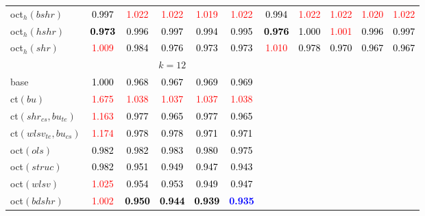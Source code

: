 \begin{tabular}[t]{l|>{}cccc>{}c|ccccc}
oct$_h(bshr)$ & \textcolor{black}{0.997} & \textcolor{red}{1.022} & \textcolor{red}{1.022} & \textcolor{red}{1.019} & \textcolor{red}{1.022} & \textcolor{black}{0.994} & \textcolor{red}{1.022} & \textcolor{red}{1.022} & \textcolor{red}{1.020} & \textcolor{red}{1.022}\\
oct$_h(hshr)$ & \textcolor{black}{\textbf{0.973}} & \textcolor{black}{0.996} & \textcolor{black}{0.997} & \textcolor{black}{0.994} & \textcolor{black}{0.995} & \textcolor{black}{\textbf{0.976}} & \textcolor{black}{1.000} & \textcolor{red}{1.001} & \textcolor{black}{0.996} & \textcolor{black}{0.997}\\
oct$_h(shr)$ & \textcolor{red}{1.009} & \textcolor{black}{0.984} & \textcolor{black}{0.976} & \textcolor{black}{0.973} & \textcolor{black}{0.973} & \textcolor{red}{1.010} & \textcolor{black}{0.978} & \textcolor{black}{0.970} & \textcolor{black}{0.967} & \textcolor{black}{0.967}\\
\addlinespace[0.3em]
\multicolumn{1}{c}{} & \multicolumn{5}{c}{\textbf{$k = 12$}} & \multicolumn{5}{c}{}\\
base & \textcolor{black}{1.000} & \textcolor{black}{0.968} & \textcolor{black}{0.967} & \textcolor{black}{0.969} & \textcolor{black}{0.969} &  &  &  &  & \\
ct$(bu)$ & \textcolor{red}{1.675} & \textcolor{red}{1.038} & \textcolor{red}{1.037} & \textcolor{red}{1.037} & \textcolor{red}{1.038} &  &  &  &  & \\
ct$(shr_{cs}, bu_{te})$ & \textcolor{red}{1.163} & \textcolor{black}{0.977} & \textcolor{black}{0.965} & \textcolor{black}{0.977} & \textcolor{black}{0.965} &  &  &  &  & \\
ct$(wlsv_{te}, bu_{cs})$ & \textcolor{red}{1.174} & \textcolor{black}{0.978} & \textcolor{black}{0.978} & \textcolor{black}{0.971} & \textcolor{black}{0.971} &  &  &  &  & \\
oct$(ols)$ & \textcolor{black}{0.982} & \textcolor{black}{0.982} & \textcolor{black}{0.983} & \textcolor{black}{0.980} & \textcolor{black}{0.975} &  &  &  &  & \\
oct$(struc)$ & \textcolor{black}{0.982} & \textcolor{black}{0.951} & \textcolor{black}{0.949} & \textcolor{black}{0.947} & \textcolor{black}{0.943} &  &  &  &  & \\
oct$(wlsv)$ & \textcolor{red}{1.025} & \textcolor{black}{0.954} & \textcolor{black}{0.953} & \textcolor{black}{0.949} & \textcolor{black}{0.947} &  &  &  &  & \\
oct$(bdshr)$ & \textcolor{red}{1.002} & \textcolor{black}{\textbf{0.950}} & \textcolor{black}{\textbf{0.944}} & \textcolor{black}{\textbf{0.939}} & \textcolor{blue}{\textbf{0.935}} &  &  &  &  & \\

\end{tabular}
